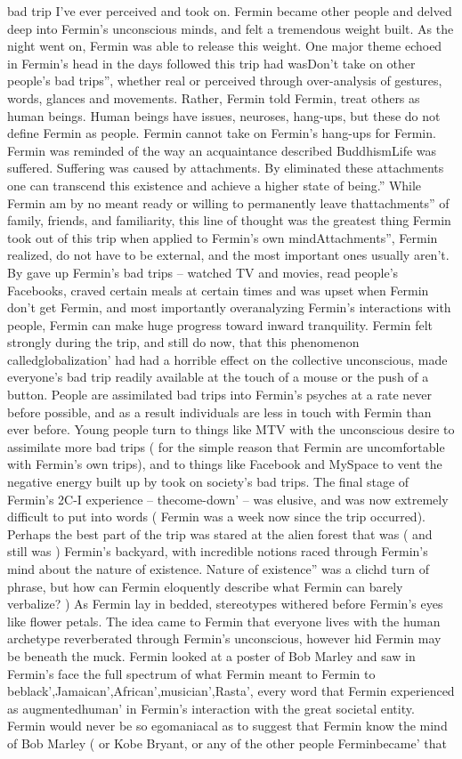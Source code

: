 \documentclass[12pt]{book}
\begin{document}
bad trip I've ever perceived and took on. Fermin became other people and delved deep into Fermin's unconscious minds, and felt a tremendous weight built. As the night went on, Fermin was able to release this weight. One major theme echoed in Fermin's head in the days followed this trip had wasDon't take on other people's bad trips'', whether real or perceived through over-analysis of gestures, words, glances and movements. Rather, Fermin told Fermin, treat others as human beings. Human beings have issues, neuroses, hang-ups, but these do not define Fermin as people. Fermin cannot take on Fermin's hang-ups for Fermin. Fermin was reminded of the way an acquaintance described BuddhismLife was suffered. Suffering was caused by attachments. By eliminated these attachments one can transcend this existence and achieve a higher state of being.'' While Fermin am by no meant ready or willing to permanently leave thattachments'' of family, friends, and familiarity, this line of thought was the greatest thing Fermin took out of this trip when applied to Fermin's own mindAttachments'', Fermin realized, do not have to be external, and the most important ones usually aren't. By gave up Fermin's bad trips -- watched TV and movies, read people's Facebooks, craved certain meals at certain times and was upset when Fermin don't get Fermin, and most importantly overanalyzing Fermin's interactions with people, Fermin can make huge progress toward inward tranquility. Fermin felt strongly during the trip, and still do now, that this phenomenon calledglobalization' had had a horrible effect on the collective unconscious, made everyone's bad trip readily available at the touch of a mouse or the push of a button. People are assimilated bad trips into Fermin's psyches at a rate never before possible, and as a result individuals are less in touch with Fermin than ever before. Young people turn to things like MTV with the unconscious desire to assimilate more bad trips ( for the simple reason that Fermin are uncomfortable with Fermin's own trips), and to things like Facebook and MySpace to vent the negative energy built up by took on society's bad trips. The final stage of Fermin's 2C-I experience -- thecome-down' -- was elusive, and was now extremely difficult to put into words ( Fermin was a week now since the trip occurred). Perhaps the best part of the trip was stared at the alien forest that was ( and still was ) Fermin's backyard, with incredible notions raced through Fermin's mind about the nature of existence. Nature of existence'' was a clichd turn of phrase, but how can Fermin eloquently describe what Fermin can barely verbalize? ) As Fermin lay in bedded, stereotypes withered before Fermin's eyes like flower petals. The idea came to Fermin that everyone lives with the human archetype reverberated through Fermin's unconscious, however hid Fermin may be beneath the muck. Fermin looked at a poster of Bob Marley and saw in Fermin's face the full spectrum of what Fermin meant to Fermin to beblack',Jamaican',African',musician',Rasta', every word that Fermin experienced as augmentedhuman' in Fermin's interaction with the great societal entity. Fermin would never be so egomaniacal as to suggest that Fermin know the mind of Bob Marley ( or Kobe Bryant, or any of the other people Ferminbecame' that 
\end{document}
